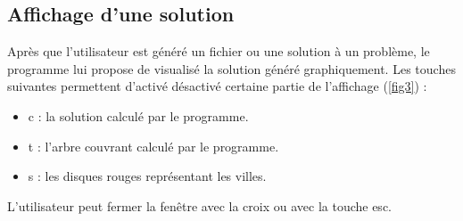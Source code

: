 \documentclass[a4paper,11pt]{article}
\begin{document}
\subsection{Affichage d'une solution}
Après que l'utilisateur est généré un fichier ou une solution à un problème, le programme lui propose de visualisé la solution généré graphiquement.
Les touches suivantes permettent d'activé désactivé certaine partie de l'affichage (\ref{fig3}) :
\begin{itemize}
\item c : la solution calculé par le programme.
\item t : l'arbre couvrant calculé par le programme.
\item s : les disques rouges représentant les villes.
\end{itemize}
L'utilisateur peut fermer la fenêtre avec la croix ou avec la touche esc.
\end{document}
